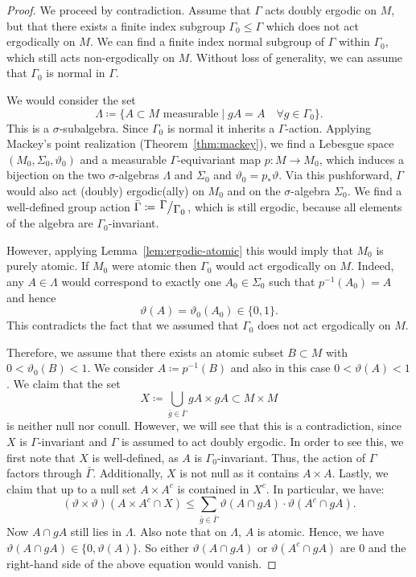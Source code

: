 \begin{proof}
  We proceed by contradiction. Assume that \(\Gamma\) acts doubly ergodic on \(M\), but that there exists a finite index subgroup \(\Gamma_0 \leq \Gamma\) which does not act ergodically on \(M\). We can find a finite index normal subgroup of \(\Gamma\) within \(\Gamma_0\), which still acts non-ergodically on \(M\). Without loss of generality, we can assume that \(\Gamma_0\) is normal in \(\Gamma\).

  We would consider the set
  \[
    \Lambda \coloneqq \{A \subset M \text{ measurable} \mid gA = A \quad \forall g \in \Gamma_0\}.
  \]
  This is a \(\sigma\)-subalgebra. Since \(\Gamma_0\) is normal it inherits a \(\Gamma\)-action. Applying Mackey's point realization (Theorem~\ref{thm:mackey}), we find a Lebesgue space \((M_0, \Sigma_0, \vartheta_0)\) and a measurable \(\Gamma\)-equivariant map \(p\colon M \to M_0\), which induces a bijection on the two \(\sigma\)-algebras \(\Lambda\) and \(\Sigma_0\) and \(\vartheta_0 = p_\ast \vartheta\). Via this pushforward, \(\Gamma\) would also act (doubly) ergodic(ally) on \(M_0\) and on the \(\sigma\)-algebra \(\Sigma_0\). We find a well-defined group action \(\bar \Gamma \coloneqq \quot{\Gamma}{\Gamma_0}\), which is still ergodic, because all elements of the algebra are \(\Gamma_0\)-invariant.

  However, applying Lemma~\ref{lem:ergodic-atomic} this would imply that \(M_0\) is purely atomic. If \(M_0\) were atomic then \(\Gamma_0\) would act ergodically on \(M\). Indeed, any \(A \in \Lambda\) would correspond  to exactly one \(A_0 \in \Sigma_0\) such that \(p^{-1}(A_0)= A\) and hence
  \[
    \vartheta(A) = \vartheta_0(A_0) \in \{0, 1\}.
  \]
  This contradicts the fact that we assumed that \(\Gamma_0\) does not act ergodically on \(M\).

  Therefore, we assume that there exists an atomic subset \(B \subset M\) with \(0 < \vartheta_0(B) < 1\). We consider \(A \coloneqq p^{-1}(B)\) and also in this case \(0 < \vartheta(A) < 1\). We claim that the set
  \[
    X \coloneqq \bigcup_{\bar g \in \bar \Gamma}gA \times gA \subset M \times M
  \]
  is neither null nor conull. However, we will see that this is a contradiction, since \(X\) is \(\Gamma\)-invariant and \(\Gamma\) is assumed to act doubly ergodic. In order to see this, we first note that \(X\) is well-defined, as \(A\) is \(\Gamma_0\)-invariant. Thus, the action of \(\Gamma\) factors through \(\bar \Gamma\). Additionally, \(X\) is not null as it contains \(A \times A\). Lastly, we claim that up to a null set \(A \times A^c\) is contained in \(X^c\). In particular, we have:
  \[
    (\vartheta\times\vartheta)(A \times A^c \cap X) \leq \sum_{\bar g \in \bar \Gamma} \vartheta(A \cap gA) \cdot \vartheta(A^c \cap gA).
  \]
  Now \(A \cap gA\) still lies in \(\Lambda\). Also note that on \(\Lambda\), \(A\) is atomic. Hence, we have \(\vartheta(A \cap gA) \in \{0, \vartheta(A)\}\). So either \(\vartheta(A \cap gA)\) or \(\vartheta(A^c \cap gA)\) are 0 and the right-hand side of the above equation would vanish.
\end{proof}

